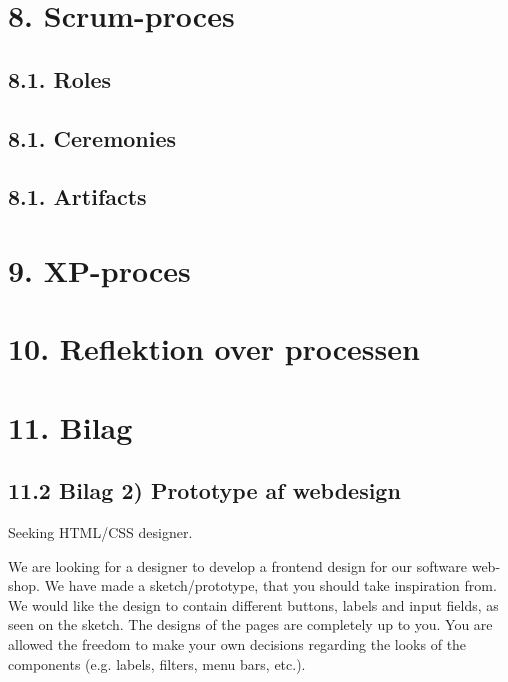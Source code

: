 \documentclass[11pt]{report}
\begin{document}
\chapter*{8. Scrum-proces}
\section*{8.1. Roles}
\section*{8.1. Ceremonies}
\section*{8.1. Artifacts}


\chapter*{9. XP-proces}


\chapter*{10. Reflektion over processen}


\chapter*{11. Bilag}

\newpage
\section*{11.2 Bilag 2) Prototype af webdesign}

\noindent Seeking HTML/CSS designer.

\noindent We are looking for a designer to develop a frontend design for our software web-shop. We have made a sketch/prototype, that you should take inspiration from. We would like the design to contain different buttons, labels and input fields, as seen on the sketch. The designs of the pages are completely up to you. You are allowed the freedom to make your own decisions regarding the looks of the components (e.g. labels, filters, menu bars, etc.).
\end{document}
